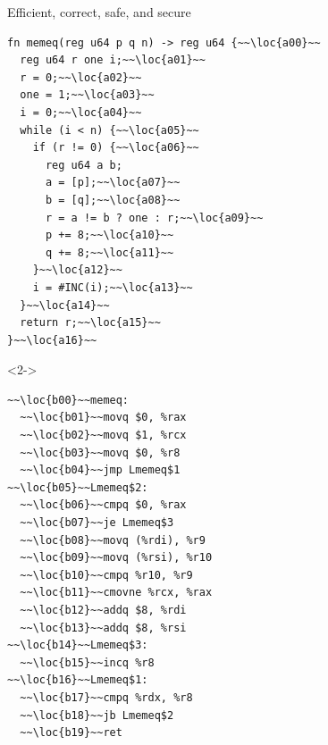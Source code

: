 \begin{frame}[fragile]{Efficient, correct, safe, and secure}
\begin{minipage}{0.55\linewidth}
  \lstset{
    language=Jasmin,
    basicstyle=\footnotesize\ttfamily,
    escapechar=~~,
  }
  \begin{lstlisting}
fn memeq(reg u64 p q n) -> reg u64 {~~\loc{a00}~~
  reg u64 r one i;~~\loc{a01}~~
  r = 0;~~\loc{a02}~~
  one = 1;~~\loc{a03}~~
  i = 0;~~\loc{a04}~~
  while (i < n) {~~\loc{a05}~~
    if (r != 0) {~~\loc{a06}~~
      reg u64 a b;
      a = [p];~~\loc{a07}~~
      b = [q];~~\loc{a08}~~
      r = a != b ? one : r;~~\loc{a09}~~
      p += 8;~~\loc{a10}~~
      q += 8;~~\loc{a11}~~
    }~~\loc{a12}~~
    i = #INC(i);~~\loc{a13}~~
  }~~\loc{a14}~~
  return r;~~\loc{a15}~~
}~~\loc{a16}~~
  \end{lstlisting}
\end{minipage}\hfill%
\begin{minipage}{0.4\linewidth}
  \begin{uncoverenv}<2->
    \lstset{
      basicstyle=\scriptsize\ttfamily,
      escapechar=~~,
    }
    \begin{lstlisting}
~~\loc{b00}~~memeq:
  ~~\loc{b01}~~movq $0, %rax
  ~~\loc{b02}~~movq $1, %rcx
  ~~\loc{b03}~~movq $0, %r8
  ~~\loc{b04}~~jmp Lmemeq$1
~~\loc{b05}~~Lmemeq$2:
  ~~\loc{b06}~~cmpq $0, %rax
  ~~\loc{b07}~~je Lmemeq$3
  ~~\loc{b08}~~movq (%rdi), %r9
  ~~\loc{b09}~~movq (%rsi), %r10
  ~~\loc{b10}~~cmpq %r10, %r9
  ~~\loc{b11}~~cmovne %rcx, %rax
  ~~\loc{b12}~~addq $8, %rdi
  ~~\loc{b13}~~addq $8, %rsi
~~\loc{b14}~~Lmemeq$3:
  ~~\loc{b15}~~incq %r8
~~\loc{b16}~~Lmemeq$1:
  ~~\loc{b17}~~cmpq %rdx, %r8
  ~~\loc{b18}~~jb Lmemeq$2
  ~~\loc{b19}~~ret
    \end{lstlisting}
  \end{uncoverenv}
\end{minipage}

\end{frame}
